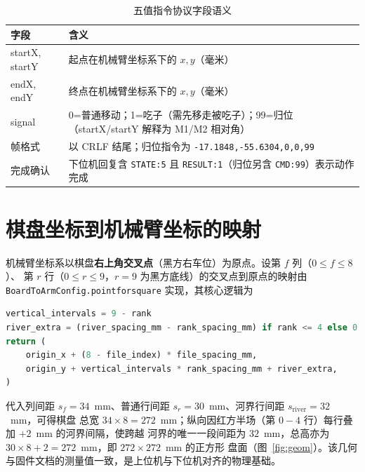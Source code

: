 \documentclass[UTF8, a4paper, 11pt, openany]{ctexbook}
\renewcommand{\_}{\textunderscore\allowbreak}
\begin{document}
\begin{table}[H]
\centering
\caption{五值指令协议字段语义}
\label{tab:proto}
\renewcommand{\arraystretch}{1.25}
\begin{tabularx}{\textwidth}{@{}>{\ttfamily\small}l X@{}}
\toprule
字段 & 含义 \\
\midrule
startX, startY & 起点在机械臂坐标系下的 $x,y$（毫米） \\
endX, endY & 终点在机械臂坐标系下的 $x,y$（毫米） \\
signal & 0=普通移动；1=吃子（需先移走被吃子）；99=归位（startX/startY 解释为 M1/M2 相对角） \\
帧格式 & 以 CRLF 结尾；归位指令为 \texttt{-17.1848,-55.6304,0,0,99} \\
完成确认 & 下位机回复含 \texttt{STATE:5} 且 \texttt{RESULT:1}（归位另含 \texttt{CMD:99}）表示动作完成 \\
\bottomrule
\end{tabularx}
\end{table}

\section{棋盘坐标到机械臂坐标的映射}
\label{sec:mapping}
机械臂坐标系以棋盘\textbf{右上角交叉点}（黑方右车位）为原点。设第 $f$ 列（$0\le f\le 8$）、
第 $r$ 行（$0\le r\le 9$，$r=9$ 为黑方底线）的交叉点到原点的映射由 \texttt{BoardToArmConfig.point\_for\_square}
实现，其核心逻辑为
\begin{lstlisting}[language=Python, caption={坐标映射核心（节选自 robot/protocol.py）}]
vertical_intervals = 9 - rank
river_extra = (river_spacing_mm - rank_spacing_mm) if rank <= 4 else 0
return (
    origin_x + (8 - file_index) * file_spacing_mm,
    origin_y + vertical_intervals * rank_spacing_mm + river_extra,
)
\end{lstlisting}
代入列间距 $s_f=34$~mm、普通行间距 $s_r=30$~mm、河界行间距 $s_{\text{river}}=32$~mm，可得棋盘
总宽 $34\times 8 = 272$~mm；纵向因红方半场（第 $0\!-\!4$ 行）每行叠加 $+2$~mm 的河界间隔，使跨越
河界的唯一一段间距为 $32$~mm，总高亦为 $30\times 8 + 2 = 272$~mm，即 $272\times272$~mm 的正方形
盘面（图~\ref{fig:geom}）。该几何与固件文档的测量值一致，是上位机与下位机对齐的物理基础。
\end{document}
